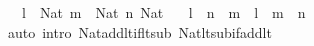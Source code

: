 \begin{isabellebody}
\ \ \ {\isachardoublequoteopen}l\ {\isacharcolon}{\kern0pt}\ Nat{\isachardoublequoteclose}\ {\isachardoublequoteopen}m\ {\isacharcolon}{\kern0pt}\ Nat{\isachardoublequoteclose}\ {\isachardoublequoteopen}n{\isacharcolon}{\kern0pt}\ Nat{\isachardoublequoteclose}\isanewline
\ \ \ {\isachardoublequoteopen}l\ {\isacharless}{\kern0pt}\ n\ {\isacharminus}{\kern0pt}\ m\ {\isasymlongleftrightarrow}\ l\ {\isacharplus}{\kern0pt}\ m\ {\isacharless}{\kern0pt}\ n{\isachardoublequoteclose}\isanewline
%
\isadelimproof
\ \ %
\endisadelimproof
%
\isatagproof
{}\isamarkupfalse%
\ {\isacharparenleft}{\kern0pt}auto\ intro{\isacharcolon}{\kern0pt}\ Nat{\isacharunderscore}{\kern0pt}add{\isacharunderscore}{\kern0pt}lt{\isacharunderscore}{\kern0pt}if{\isacharunderscore}{\kern0pt}lt{\isacharunderscore}{\kern0pt}sub\ Nat{\isacharunderscore}{\kern0pt}lt{\isacharunderscore}{\kern0pt}sub{\isacharunderscore}{\kern0pt}if{\isacharunderscore}{\kern0pt}add{\isacharunderscore}{\kern0pt}lt{\isacharparenright}{\kern0pt}%
\endisatagproof
{\isafoldproof}%
%
\isadelimproof
\isanewline
%
\endisadelimproof
\isanewline
%
\isadelimtheory
\isanewline
%
\endisadelimtheory
%
\isatagtheory
{}\isamarkupfalse%
%
\endisatagtheory
{\isafoldtheory}%
%
\isadelimtheory
%
\endisadelimtheory
%
\end{isabellebody}%
\endinput
